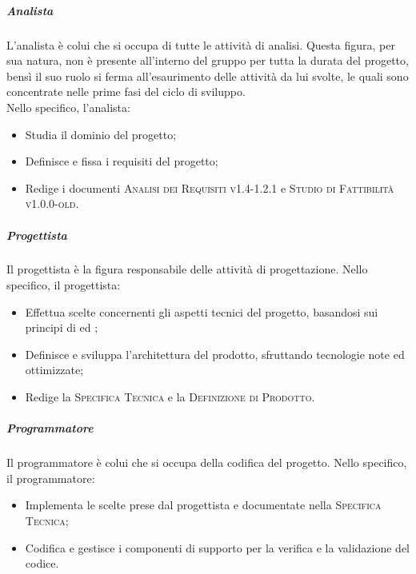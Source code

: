 \subparagraph{Analista}
L'analista è colui che si occupa di tutte le attività di analisi. Questa figura, per sua natura, non è presente all'interno del gruppo per tutta la durata del progetto, bensì il suo ruolo si ferma all'esaurimento delle attività da lui svolte, le quali sono concentrate nelle prime fasi del ciclo di sviluppo. \\
Nello specifico, l'analista:
\begin{itemize}
  \item Studia il dominio del progetto;
  \item Definisce e fissa i requisiti del progetto;
  \item Redige i documenti \textsc{Analisi dei Requisiti v1.4-1.2.1} e \textsc{Studio di Fattibilità v1.0.0-old}.
\end{itemize}

\subparagraph{Progettista}
Il progettista è la figura responsabile delle attività di progettazione. Nello specifico, il progettista:
\begin{itemize}
  \item Effettua scelte concernenti gli aspetti tecnici del progetto, basandosi sui principi di  ed ;
  \item Definisce e sviluppa l'architettura del prodotto, sfruttando tecnologie note ed ottimizzate;
  \item Redige la \textsc{Specifica Tecnica} e la \textsc{Definizione di Prodotto}.
\end{itemize}

\subparagraph{Programmatore}
Il programmatore è colui che si occupa della codifica del progetto. Nello specifico, il programmatore:
\begin{itemize}
  \item Implementa le scelte prese dal progettista e documentate nella \textsc{Specifica Tecnica};
  \item Codifica e gestisce i componenti di supporto per la verifica e la validazione del codice.
\end{itemize}

